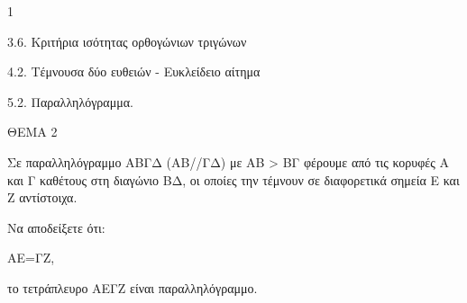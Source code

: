 \begin{ylh}{1}
    \item 3.6. Κριτήρια ισότητας ορθογώνιων τριγώνων
    \item 4.2. Τέμνουσα δύο ευθειών - Ευκλείδειο αίτημα
    \item 5.2. Παραλληλόγραμμα.
\end{ylh}

ΘΕΜΑ 2

Σε παραλληλόγραμμο ΑΒΓΔ (ΑΒ//ΓΔ) με ΑΒ \textgreater{} ΒΓ φέρουμε από τις κορυφές Α και Γ καθέτους στη διαγώνιο ΒΔ, οι οποίες την τέμνουν σε διαφορετικά σημεία Ε και Ζ αντίστοιχα.

Να αποδείξετε ότι:

\begin{alist}
\item ΑΕ=ΓΖ, 

\item το τετράπλευρο ΑΕΓΖ είναι παραλληλόγραμμο. 


\begin{center}
\end{center}
\end{alist}
